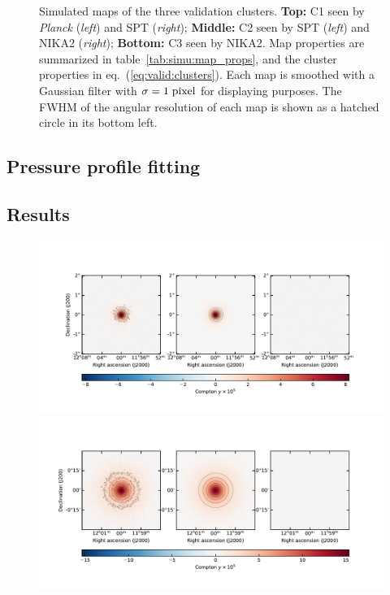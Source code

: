 \begin{figure}[t]
    \caption{%
        Simulated maps of the three validation clusters.
        \textbf{Top:} C1 seen by \textit{Planck} (\textit{left}) and SPT (\textit{right});
        \textbf{Middle:} C2 seen by SPT (\textit{left}) and NIKA2 (\textit{right});
        \textbf{Bottom:} C3 seen by NIKA2.
        Map properties are summarized in table~\ref{tab:simu:map_props}, and the cluster properties in eq.~(\ref{eq:valid:clusters}).
        Each map is smoothed with a Gaussian filter with $\sigma = 1 \; {\rm pixel}$ for displaying purposes.
        The FWHM of the angular resolution of each map is shown as a hatched circle in its bottom left.
    }
    \label{fig:valid:maps}
\end{figure}

\subsection{Pressure profile fitting}

\subsection{Results} \label{sec:simu:results}

\begin{figure}[t]
    \centering
    \includegraphics[width=\linewidth, trim={0 1cm 0 2cm}, clip]{Figures/C1_planck_dmr_2d.pdf}
    \includegraphics[width=\linewidth, trim={0 1cm 0 2cm}, clip]{Figures/C1_spt_dmr_2d.pdf}
    \caption{}
    \label{fig:}
\end{figure}
